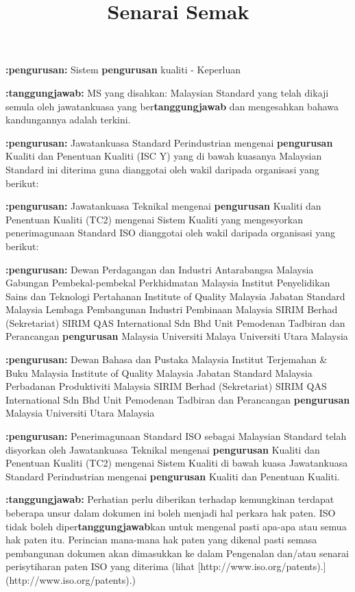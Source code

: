 \documentclass{article}
\title{Senarai Semak}
\begin{document}
\textbf{:pengurusan:} Sistem \textbf{pengurusan} kualiti - Keperluan

\textbf{:tanggungjawab:} MS yang disahkan: Malaysian Standard yang telah dikaji semula oleh jawatankuasa yang
ber\textbf{tanggungjawab} dan mengesahkan bahawa kandungannya adalah terkini.

\textbf{:pengurusan:} Jawatankuasa Standard Perindustrian mengenai \textbf{pengurusan} Kualiti dan Penentuan Kualiti (ISC Y) yang di bawah
kuasanya Malaysian Standard ini diterima guna dianggotai oleh wakil daripada organisasi yang berikut:

\textbf{:pengurusan:} Jawatankuasa Teknikal mengenai \textbf{pengurusan} Kualiti dan Penentuan Kualiti (TC2) mengenai Sistem Kualiti yang
mengesyorkan penerimagunaan Standard ISO dianggotai oleh wakil daripada organisasi yang berikut:

\textbf{:pengurusan:} Dewan Perdagangan dan Industri Antarabangsa Malaysia
Gabungan Pembekal-pembekal Perkhidmatan Malaysia
Institut Penyelidikan Sains dan Teknologi Pertahanan
Institute of Quality Malaysia
Jabatan Standard Malaysia
Lembaga Pembangunan Industri Pembinaan Malaysia
SIRIM Berhad (Sekretariat)
SIRIM QAS International Sdn Bhd
Unit Pemodenan Tadbiran dan Perancangan \textbf{pengurusan} Malaysia
Universiti Malaya
Universiti Utara Malaysia

\textbf{:pengurusan:} Dewan Bahasa dan Pustaka Malaysia
Institut Terjemahan & Buku Malaysia
Institute of Quality Malaysia
Jabatan Standard Malaysia
Perbadanan Produktiviti Malaysia
SIRIM Berhad (Sekretariat)
SIRIM QAS International Sdn Bhd
Unit Pemodenan Tadbiran dan Perancangan \textbf{pengurusan} Malaysia
Universiti Utara Malaysia

\textbf{:pengurusan:} Penerimagunaan Standard ISO sebagai Malaysian Standard telah disyorkan oleh
Jawatankuasa Teknikal mengenai \textbf{pengurusan} Kualiti dan Penentuan Kualiti (TC2) mengenai
Sistem Kualiti di bawah kuasa Jawatankuasa Standard Perindustrian mengenai \textbf{pengurusan}
Kualiti dan Penentuan Kualiti.

\textbf{:tanggungjawab:} Perhatian perlu diberikan terhadap kemungkinan terdapat beberapa unsur dalam dokumen ini
boleh menjadi hal perkara hak paten. ISO tidak boleh diper\textbf{tanggungjawab}kan untuk
mengenal pasti apa-apa atau semua hak paten itu. Perincian mana-mana hak paten yang
dikenal pasti semasa pembangunan dokumen akan dimasukkan ke dalam Pengenalan
dan/atau senarai perisytiharan paten ISO yang diterima (lihat [http://www.iso.org/patents).](http://www.iso.org/patents).)
\end{document}
